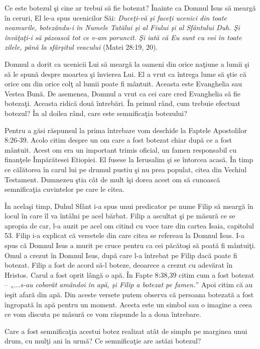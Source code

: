 \newpage


Ce este botezul şi cine ar trebui să fie botezat? Înainte ca Domnul Isus să meargă în ceruri, El le-a spus ucenicilor Săi: \textit{Duceţi-vă şi faceţi ucenici din toate neamurile, botezându-i în Numele Tatălui şi al Fiului şi al Sfântului Duh. Şi învăţaţi-i să păzească tot ce v-am poruncit. Şi iată că Eu sunt cu voi în toate zilele, până la sfârşitul veacului} (Matei 28:19, 20).

Domnul a dorit ca ucenicii Lui să meargă la oameni din orice naţiune a lumii şi să le spună despre moartea şi învierea Lui. El a vrut ca întrega lume să ştie că orice om din orice colţ al lumii poate fi mântuit. Aceasta este Evanghelia sau Vestea Bună. De asemenea, Domnul a vrut ca cei care cred Evanghelia să fie botezaţi. Aceasta ridică două întrebări. În primul rând, cum trebuie efectuat botezul? În al doilea rând, care este semnificaţia botezului?

Pentru a găsi răspunsul la prima întrebare vom deschide la Faptele Apostolilor 8:26-39. Acolo citim despre un om care a fost botezat chiar după ce a fost mântuit. Acest om era un important trimis oficial, un famen responsabil cu finanţele Împărătesei Etiopiei. El fusese la Ierusalim şi se întorcea acasă. În timp ce călătorea în carul lui pe drumul pustiu şi nu prea populat, citea din Vechiul Testament. Dumnezeu ştia cât de mult îşi dorea acest om să cunoască semnificaţia cuvintelor pe care le citea. 

În acelaşi timp, Duhul Sfânt i-a spus unui predicator pe nume Filip să meargă în locul în care îl va întâlni pe acel bărbat. Filip a ascultat şi pe măsură ce se apropia de car, l-a auzit pe acel om citind cu voce tare din cartea Isaia, capitolul 53. Filip i-a explicat că versetele din care citea se refereau la Domnul Isus. I-a spus că Domnul Isus a murit pe cruce pentru ca cei păcătoşi să poată fi mântuiţi. Omul a crezut în Domnul Isus, după care l-a întrebat pe Filip dacă poate fi botezat. Filip a fost de acord să-l boteze, deoarece a crezut cu adevărat în Hristos. Carul a fost oprit lângă o apă. În Fapte 8:38,39 citim cum a fost botezat – „\textit{...s-au coborât amândoi în apă, şi Filip a botezat pe famen.}” Apoi citim că au ieşit afară din apă. Din aceste versete putem observa că persoana botezată a fost îngropată în apă pentru un moment. Acesta este un simbol sau o imagine a ceea ce vom discuta pe măsură ce vom răspunde la a doua întrebare.

Care a fost semnificaţia acestui botez realizat atât de simplu pe marginea unui drum, cu mulţi ani în urmă? Ce semnificaţie are astăzi botezul?

